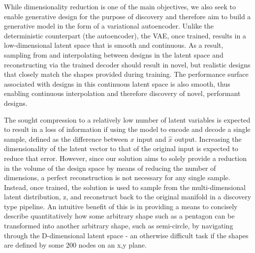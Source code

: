 \documentclass{article}
\begin{document}
While dimensionality reduction is one of the main objectives, we also seek to enable generative design for the purpose of discovery and therefore aim to build a generative model in the form of a variational autoencoder. Unlike the deterministic counterpart (the autoencoder), the VAE, once trained, results in a low-dimensional latent space that is smooth and continuous. As a result, sampling from and interpolating between designs in the latent space and reconstructing via the trained decoder should result in novel, but realistic designs that closely match the shapes provided during training. The performance surface associated with designs in this continuous latent space is also smooth, thus enabling continuous interpolation and therefore discovery of novel, performant designs.  

The sought compression to a relatively low number of latent variables is expected to result in a loss of information if using the model to encode and decode a single sample, defined as the difference between $x$ input and $\hat{x}$ output. Increasing the dimensionality of the latent vector to that of the original input is expected to reduce that error. However, since our solution aims to solely provide a reduction in the volume of the design space by means of reducing the number of dimensions, a perfect reconstruction is not necessary for any single sample. Instead, once trained, the solution is used to sample from the multi-dimensional latent distribution, z, and reconstruct back to the original manifold in a discovery type pipeline. An intuitive benefit of this is in providing a means to concisely describe quantitatively how some arbitrary shape such as a pentagon can be transformed into another arbitrary shape, such as semi-circle, by navigating through the D-dimensional latent space - an otherwise difficult task if the shapes are defined by some 200 nodes on an x,y plane. 
\end{document}
